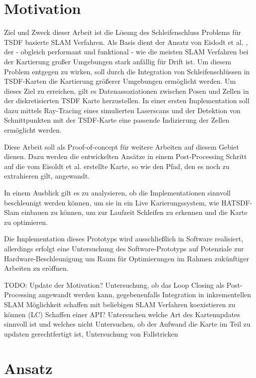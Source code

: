 \section{Motivation}

Ziel und Zweck dieser Arbeit ist die Lösung des Schleifenschluss Problems für TSDF basierte SLAM Verfahren.
Als Basis dient der Ansatz von Eislodt et al. \cite{HATSDF}, der - obgleich performant und funktional - wie die meisten SLAM Verfahren bei der Kartierung großer Umgebungen stark anfällig für Drift ist. Um diesem Problem entgegen zu wirken, soll durch die Integration von Schleifenschlüssen in TSDF-Karten die Kartierung größerer Umgebungen ermöglicht werden.
Um dieses Ziel zu erreichen, gilt es Datenassoziationen zwischen Posen und Zellen in der diskretisierten TSDF Karte herzustellen.
In einer ersten Implementation soll dazu mittels Ray-Tracing eines simulierten Laserscans und der Detektion von Schnittpunkten mit der TSDF-Karte eine passende Indizierung der Zellen ermöglicht werden.

Diese Arbeit soll als Proof-of-concept für weitere Arbeiten auf diesem Gebiet dienen. Dazu werden die entwickelten Ansätze in einem Post-Processing Schritt auf die vom Eisoldt et al. \cite{HATSDF} erstellte Karte, so wie den Pfad, den es noch zu extrahieren gilt, angewandt.


In einem Ausblick gilt es zu analysieren, ob die Implementationen sinnvoll beschleunigt werden können, um sie in ein Live Karierungssystem, wie HATSDF-Slam einbauen zu können, um zur Laufzeit Schleifen zu erkennen und die Karte zu optimieren.

Die Implementation dieses Prototyps wird ausschließlich in Software realisiert, allerdings erfolgt eine Untersuchung des Software-Prototyps auf Potenziale zur Hardware-Beschleunigung um Raum für Optimierungen im Rahmen zukünftiger Arbeiten zu eröffnen.

TODO: Update der Motivation? 
Untersuchung, ob das Loop Closing als Post-Processing angewandt werden kann, gegebenenfalls Integration in inkrementellen SLAM
Möglichkeit schaffen mit beliebigen SLAM Verfahren koexistieren zu können (LC)
Schaffen einer API?
Untersuchen welche Art des Kartenupdates sinnvoll ist und welches nicht
Untersuchen, ob der Aufwand die Karte im Teil zu updaten gerechtfertigt ist, Untersuchung von Fallstricken

\section{Ansatz}

